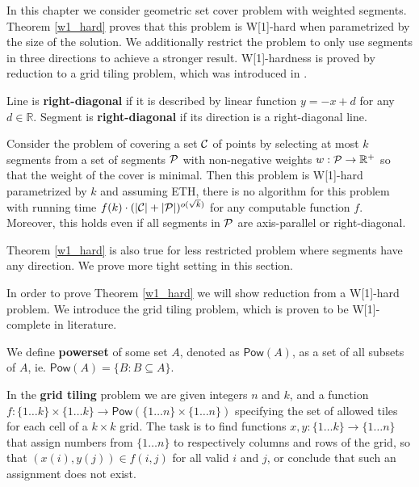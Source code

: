In this chapter we consider geometric set cover problem with weighted segments.
Theorem \ref{w1_hard} proves that this problem is 
W[1]-hard when parametrized by the size of the solution.
We additionally restrict the problem to only use segments
in three directions to achieve a stronger result.
W[1]-hardness is proved by reduction to a grid tiling problem,
which was introduced in \cite{marx_grid_tiling}.

\begin{defi}
	Line is \textbf{right-diagonal} if it is
	described by linear function $y = -x + d$ for any $d \in \mathbb{R}$.
	Segment is \textbf{right-diagonal} if its
	direction is a right-diagonal line.
\end{defi}

\begin{tw}
\label{w1_hard}
	Consider the problem of covering a set $\mathcal{C}$ of points
	by selecting at most $k$ segments
	from a set of segments $\mathcal{P}$ 
	with non-negative weights $w : \mathcal{P} \rightarrow \mathbb{R^+}$
	so that the weight of the cover is minimal.
	Then this problem is W[1]-hard parametrized by $k$ and
	assuming ETH, there is no algorithm for this
	problem with running time
	$f(k)\cdot(|\mathcal{C}| + |\mathcal{P}|)^{o(\sqrt{k})}$
	for any computable function $f$.
	Moreover, this holds even if all segments in $\mathcal{P}$
	are axis-parallel or right-diagonal.
\end{tw}

Theorem \ref{w1_hard} is also true for less
restricted problem where segments have any direction.
We prove more tight setting in this section.

In order to prove Theorem \ref{w1_hard}
we will show reduction from a W[1]-hard problem.
We introduce the grid tiling problem, which is proven
to be W[1]-complete in literature.

\newcommand{\pow}{\mathsf{Pow}}

\begin{defi}
We define \textbf{powerset} of some set $A$, denoted as $\pow(A)$,
as a set of all subsets of $A$, ie. $\pow(A) = \{B : B \subseteq A\}$.
\end{defi}

\begin{defi}
In the \textbf{grid tiling} problem we are given integers $n$ and $k$,
and a function
$f : \{1 \ldots k\} \times \{1 \ldots k\} \rightarrow \pow(\{1 \ldots n\} \times \{1 \ldots n\})$
specifying the set of allowed tiles for each cell of a $k \times k$ grid.
The task is to find functions
$x,y : \{1 \ldots k\} \rightarrow \{1 \ldots n\}$
that assign numbers from $\{1 \ldots n\}$
to respectively columns and rows of the grid,
so that $(x(i), y(j)) \in f(i, j)$ for all valid $i$ and $j$,
or conclude that such an assignment does not exist.
\end{defi}

